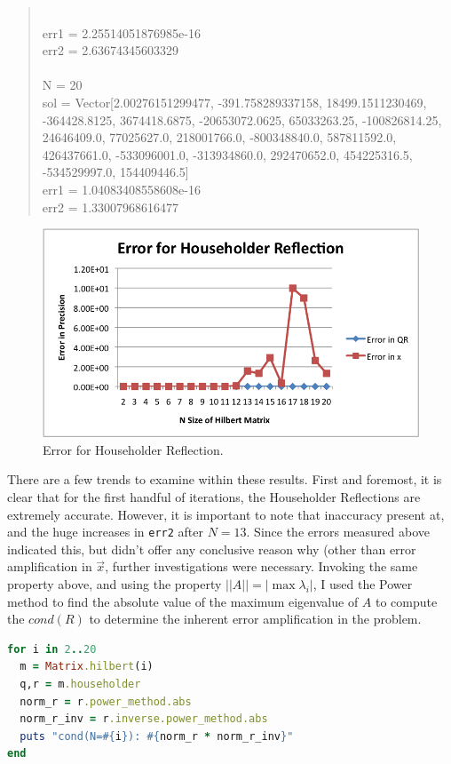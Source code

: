 \documentclass[letterpaper,12pt]{article}
\begin{document}
\begin{quote}
\\err1 = 2.25514051876985e-16
\\err2 = 2.63674345603329
\\
\\N = 20
\\sol = Vector[2.00276151299477, -391.758289337158, 18499.1511230469, -364428.8125, 3674418.6875, -20653072.0625, 65033263.25, -100826814.25, 24646409.0, 77025627.0, 218001766.0, -800348840.0, 587811592.0, 426437661.0, -533096001.0, -313934860.0, 292470652.0, 454225316.5, -534529997.0, 154409446.5]
\\err1 = 1.04083408558608e-16
\\err2 = 1.33007968616477
\end{quote}

\begin{figure}[h]
  \centering
  \includegraphics{householder.png}
  \caption{\label{householder}Error for Householder Reflection.}
\end{figure} 


There are a few trends to examine within these results.
First and foremost, it is clear that for the first handful of iterations, the
Householder Reflections are extremely accurate.
However, it is important to note that inaccuracy present at, and the huge
increases in \texttt{err2} after $N =13$.
Since the errors measured above indicated this, but didn't offer any conclusive
reason why (other than error amplification in $\vec{x}$, further investigations
were necessary.
Invoking the same property above, and using the property $||A|| = |\max{\lambda_i}|$,
I used the Power method to find the absolute value of the maximum eigenvalue of
$A$ to compute the $cond(R)$ to determine the inherent error amplification in the
problem.

\lstset{caption=Determining cond(R) for Householder}
\begin{lstlisting}[language=ruby]
for i in 2..20
  m = Matrix.hilbert(i)
  q,r = m.householder
  norm_r = r.power_method.abs
  norm_r_inv = r.inverse.power_method.abs
  puts "cond(N=#{i}): #{norm_r * norm_r_inv}"
end
\end{lstlisting}
\end{document}
